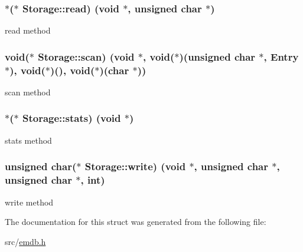 \subsubsection[{read}]{$\ast$($\ast$ Storage\+::read) (void $\ast$, unsigned char $\ast$)}\label{struct_storage_a6f8774ce9a6598367d47eaeafaf245d4}
read method \hypertarget{struct_storage_a2d0db132a4fefd7d3da72d2b27c2e98a}{}
\subsubsection[{scan}]{\setlength{\rightskip}{0pt plus 5cm}void($\ast$ Storage\+::scan) (void $\ast$, void($\ast$)(unsigned char $\ast$, {\bf Entry} $\ast$), void($\ast$)(), void($\ast$)(char $\ast$))}\label{struct_storage_a2d0db132a4fefd7d3da72d2b27c2e98a}
scan method \hypertarget{struct_storage_a6642751e068c1e64f8b65703a8bc51a0}{}
\subsubsection[{stats}]{$\ast$($\ast$ Storage\+::stats) (void $\ast$)}\label{struct_storage_a6642751e068c1e64f8b65703a8bc51a0}
stats method \hypertarget{struct_storage_a277c5f5a2ec42f4b66e83a95fb2b679c}{}
\subsubsection[{write}]{\setlength{\rightskip}{0pt plus 5cm}unsigned char($\ast$ Storage\+::write) (void $\ast$, unsigned char $\ast$, unsigned char $\ast$, int)}\label{struct_storage_a277c5f5a2ec42f4b66e83a95fb2b679c}
write method 

The documentation for this struct was generated from the following file\+:\begin{DoxyCompactItemize}
\item 
src/\hyperlink{emdb_8h}{emdb.\+h}\end{DoxyCompactItemize}
